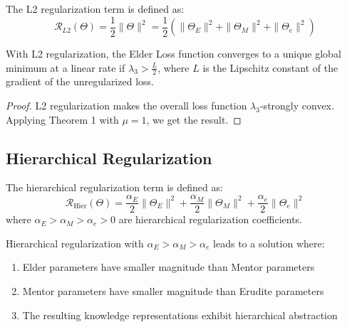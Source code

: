 \begin{definition}[L2 Regularization]
The L2 regularization term is defined as:
\begin{equation}
\mathcal{R}_{L2}(\Theta) = \frac{1}{2}\|\Theta\|^2 = \frac{1}{2}(\|\Theta_E\|^2 + \|\Theta_M\|^2 + \|\Theta_e\|^2)
\end{equation}
\end{definition}

\begin{theorem}
With L2 regularization, the Elder Loss function converges to a unique global minimum at a linear rate if $\lambda_3 > \frac{L}{2}$, where $L$ is the Lipschitz constant of the gradient of the unregularized loss.
\end{theorem}

\begin{proof}
L2 regularization makes the overall loss function $\lambda_3$-strongly convex. Applying Theorem 1 with $\mu = 1$, we get the result.
\end{proof}

\subsection{Hierarchical Regularization}

\begin{definition}
The hierarchical regularization term is defined as:
\begin{equation}
\mathcal{R}_{\text{Hier}}(\Theta) = \frac{\alpha_E}{2}\|\Theta_E\|^2 + \frac{\alpha_M}{2}\|\Theta_M\|^2 + \frac{\alpha_e}{2}\|\Theta_e\|^2
\end{equation}
where $\alpha_E > \alpha_M > \alpha_e > 0$ are hierarchical regularization coefficients.
\end{definition}

\begin{theorem}
Hierarchical regularization with $\alpha_E > \alpha_M > \alpha_e$ leads to a solution where:
\begin{enumerate}
    \item Elder parameters have smaller magnitude than Mentor parameters
    \item Mentor parameters have smaller magnitude than Erudite parameters
    \item The resulting knowledge representations exhibit hierarchical abstraction
\end{enumerate}
\end{theorem}

